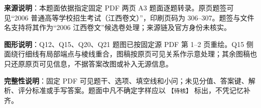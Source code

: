 


\begin{gktip}
\textbf{来源说明}：本题面依据指定固定 PDF 两页 A3 题面逐题转录。原页题签可见“2006 普通高等学校招生考试（江西卷文）”，印刷页码为 306–307。题签与文件名支持将其作为“2006 江西卷文”候选卷处理；来源链及官方身份未核实。

\textbf{图形说明}：Q12、Q15、Q20、Q21 题图已按固定源 PDF 第 1–2 页重绘。Q15 侧面绕行细线有局部端点与棱线重合，图稿按原页可见关系作示意处理；其余图稿也只还原原页可见信息，不据答案改图或补入无源信息。

\textbf{完整性说明}：固定 PDF 可见题干、选项、填空线和小问；未见分值、答案键、解析、评分标准或手写答案。题面中凡不确定字样应以 \texttt{【待核】} 标出，不凭记忆补齐。
\end{gktip}


